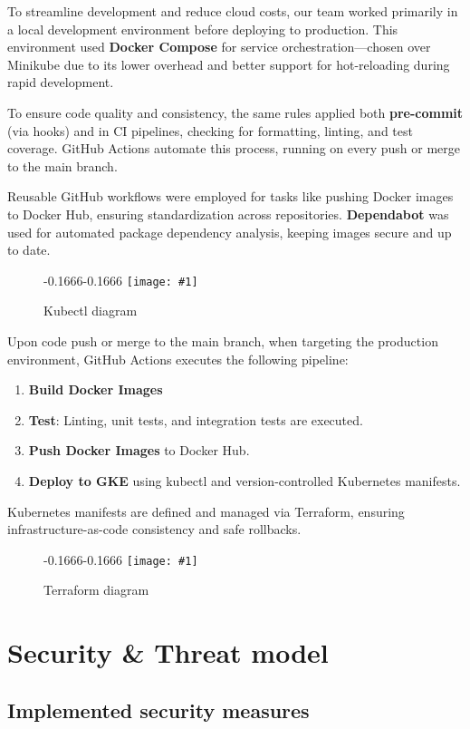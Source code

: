 \documentclass[11pt,a4paper]{article}
\newcommand{\fullpageimage}[1]{%
  \begin{adjustwidth*}{-0.1666\paperwidth}{-0.1666\paperwidth}
    \noindent\texttt{[image: \#1]}
  \end{adjustwidth*}
}
\begin{document}
To streamline development and reduce cloud costs, our team worked primarily in a local development environment before deploying to production. This environment used \textbf{Docker Compose} for service orchestration—chosen over Minikube due to its lower overhead and better support for hot-reloading during rapid development.

To ensure code quality and consistency, the same rules applied both \textbf{pre-commit} (via hooks) and in CI pipelines, checking for formatting, linting, and test coverage. GitHub Actions automate this process, running on every push or merge to the main branch.

Reusable GitHub workflows were employed for tasks like pushing Docker images to Docker Hub, ensuring standardization across repositories. \textbf{Dependabot} was used for automated package dependency analysis, keeping images secure and up to date.

\begin{figure}
  \centering
  \fullpageimage{kubectl.png}
  \caption{Kubectl diagram}
  \label{fig:kubectl}
\end{figure}
Upon code push or merge to the main branch, when targeting the production environment, GitHub Actions executes
the following pipeline:
\begin{enumerate}
  \item \textbf{Build Docker Images}
  \item \textbf{Test}: Linting, unit tests, and integration tests are executed.
  \item \textbf{Push Docker Images} to Docker Hub.
  \item \textbf{Deploy to GKE} using kubectl and version-controlled
    Kubernetes manifests.
\end{enumerate}

Kubernetes manifests are defined and managed via Terraform, ensuring
infrastructure-as-code consistency and safe rollbacks.

\begin{figure}[H]
  \centering
  \fullpageimage{terraform.png}
  \caption{Terraform diagram}
  \label{fig:terraform}
\end{figure}

\section{Security \& Threat model}

\subsection{Implemented security measures}
\label{sub:security}
\end{document}
